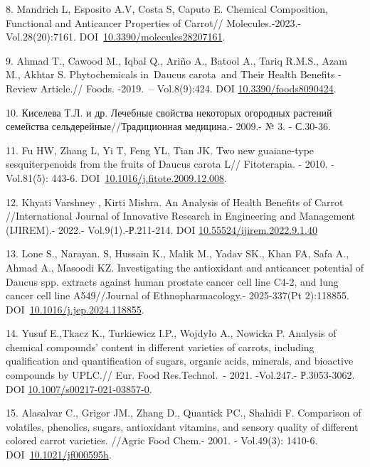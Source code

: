 8. Mandrich L, Esposito A.V, Costa S, Caputo E. Chemical Composition,
Functional and Anticancer Properties of Carrot// Molecules.-2023.-
Vol.28(20):7161.
DOI~\href{https://doi.org/10.3390/molecules28207161}{10.3390/molecules28207161}.

9. Ahmad T., Cawood M., Iqbal Q., Ariño A., Batool A., Tariq R.M.S.,
Azam M., Akhtar S. Phytochemicals in~Daucus carota~and Their Health
Benefits -Review Article.// Foods. -2019.~-- Vol.8(9):424. DOI
\href{https://doi.org/10.3390/foods8090424}{10.3390/foods8090424}.

10. Киселева Т.Л. и др. Лечебные свойства некоторых огородных растений
семейства сельдерейные//Традиционная медицина.- 2009.- № 3. - С.30-36.

11. Fu HW, Zhang L, Yi T, Feng YL, Tian JK. Two new guaiane-type
sesquiterpenoids from the fruits of Daucus carota L// Fitoterapia. -
2010. -Vol.81(5): 443-6.
DOI~\href{https://doi.org/10.1016/j.fitote.2009.12.008}{10.1016/j.fitote.2009.12.008}.

12. Khyati Varshney , Kirti Mishra. An Analysis of Health Benefits of
Carrot //International Journal of Innovative Research in Engineering and
Management (IJIREM).- 2022.- Vol.9(1).-Р.211-214. DOI
\href{http://dx.doi.org/10.55524/ijirem.2022.9.1.40}{10.55524/ijirem.2022.9.1.40}

13. Lone S., Narayan. S, Hussain K., Malik M., Yadav SK., Khan FA, Safa
A., Ahmad A., Masoodi KZ. Investigating the antioxidant and anticancer
potential of Daucus spp. extracts against human prostate cancer cell
line C4-2, and lung cancer cell line A549//Journal of
Ethnopharmacology.- 2025-337(Pt 2):118855.
DOI~\href{https://doi.org/10.1016/j.jep.2024.118855}{10.1016/j.jep.2024.118855}.

14. Yusuf E.,Tkacz K., Turkiewicz I.P., Wojdyło A., Nowicka P. Analysis
of chemical compounds' content in different varieties of carrots,
including qualification and quantification of sugars, organic acids,
minerals, and bioactive compounds by UPLC.// Eur. Food Res.Technol.~-
2021. -Vol.247.- Р.3053-3062. DOI
\href{https://link.springer.com/article/10.1007\%2Fs00217-021-03857-0}{10.1007/s00217-021-03857-0}.

15. Alasalvar C., Grigor JM., Zhang D., Quantick PC., Shahidi F.
Comparison of volatiles, phenolics, sugars, antioxidant vitamins, and
sensory quality of different colored carrot varieties. //Agric Food
Chem.- 2001. - Vol.49(3): 1410-6.
DOI~\href{https://doi.org/10.1021/jf000595h}{10.1021/jf000595h}.

